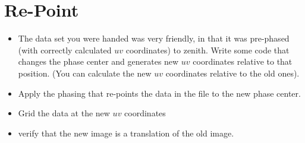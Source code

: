 \documentclass[11pt]{article}
\begin{document}
\section{Re-Point}

\begin{itemize}
\item The data set you were handed was very friendly, in that it was pre-phased (with correctly
calculated $uv$ coordinates) to zenith.  Write some code that changes the phase center and generates
new $uv$ coordinates relative to that position.  (You can calculate the new $uv$ coordinates relative
to the old ones).
\item Apply the phasing that re-points the data in the file to the new phase center.
\item Grid the data at the new $uv$ coordinates
\item verify that the new image is a translation of the old image.
\end{itemize}
\end{document}
